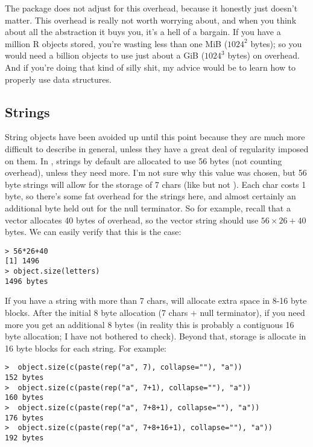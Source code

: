 The  package does not adjust for this overhead, because it honestly just doesn't matter.  This overhead is really not worth worrying about, and when you think about all the abstraction it buys you, it's a hell of a bargain.  If you have a million R objects stored, you're wasting less than one MiB ($1024^2$ bytes); so you would need a billion objects to use just about a GiB ($1024^3$ bytes) on overhead.  And if you're doing that kind of silly shit, my advice would be to learn how to properly use data structures.



\subsection{Strings}

String objects have been avoided up until this point because they are much more difficult to describe in general, unless they have a great deal of regularity imposed on them.  In , strings by default are allocated to use 56 bytes (not counting overhead), unless they need more.  I'm not sure why this value was chosen, but 56 byte strings will allow for the storage of 7 chars (like  but not ).  Each char costs 1 byte, so there's some fat overhead for the strings here, and almost certainly an additional byte held out for the null terminator.  So for example, recall that a vector allocates 40 bytes of overhead, so the vector string  should use $56\times 26 + 40$ bytes.  We can easily verify that this is the case:
\begin{lstlisting}[language=rr]
> 56*26+40
[1] 1496
> object.size(letters)
1496 bytes
\end{lstlisting}

If you have a string with more than 7 chars,  will allocate extra space in 8-16 byte blocks.  After the initial 8 byte allocation (7 chars $+$ null terminator), if you need more you get an additional 8 bytes (in reality this is probably a contiguous 16 byte allocation; I have not bothered to check).  Beyond that, storage is allocate in 16 byte blocks for each string.  For example:
\begin{lstlisting}[language=rr]
>  object.size(c(paste(rep("a", 7), collapse=""), "a")) 
152 bytes
>  object.size(c(paste(rep("a", 7+1), collapse=""), "a")) 
160 bytes
>  object.size(c(paste(rep("a", 7+8+1), collapse=""), "a")) 
176 bytes
>  object.size(c(paste(rep("a", 7+8+16+1), collapse=""), "a")) 
192 bytes
\end{lstlisting}

